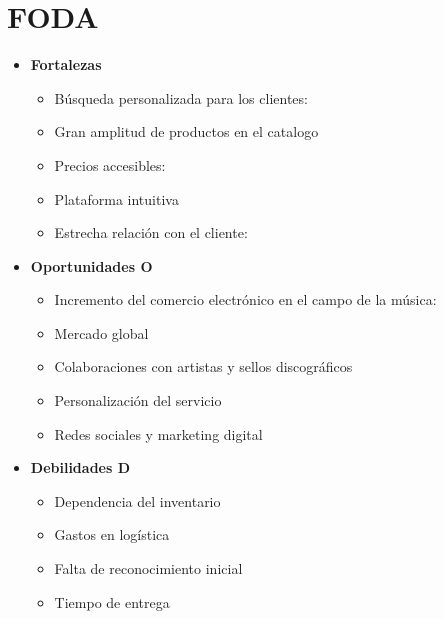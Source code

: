 \documentclass[12pt]{article}
\begin{document}
 \section*{FODA}

\begin{itemize}
	\item \textbf{Fortalezas} 

	\begin{itemize}
		\item Búsqueda personalizada para los clientes:

		\item Gran amplitud de productos en el catalogo

		\item Precios accesibles:

		\item Plataforma intuitiva

		\item Estrecha relación con el cliente:

	\end{itemize}

	\item \textbf{Oportunidades O}

	\begin{itemize}
		\item Incremento del comercio electrónico en el campo de la música:

		\item Mercado global

		\item Colaboraciones con artistas y sellos discográficos

		\item Personalización del servicio

		\item Redes sociales y marketing digital
	\end{itemize}

	\item \textbf{Debilidades D}

	\begin{itemize}
		\item Dependencia del inventario
		
		\item Gastos en logística
		
		\item Falta de reconocimiento inicial
		
		\item Tiempo de entrega
		

\end{itemize}
\end{itemize}
\end{document}
